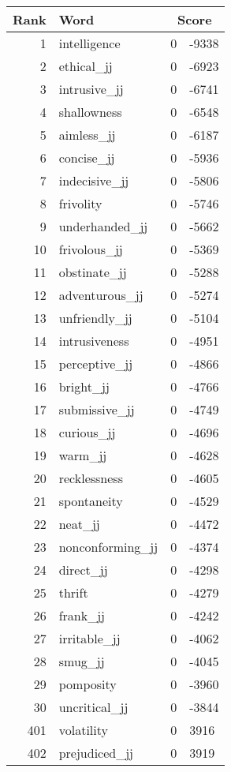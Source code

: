 \begin{longtable}[!htbp]{| rlr@{.}l |}
    \hline
    \textbf{Rank} & \textbf{Word} & \multicolumn{2}{c|}{\textbf{Score}} \\
    \hline
    \endhead
    1 & intelligence & 0 & -9338 \\
    2 & ethical\_jj & 0 & -6923 \\
    3 & intrusive\_jj & 0 & -6741 \\
    4 & shallowness & 0 & -6548 \\
    5 & aimless\_jj & 0 & -6187 \\
    6 & concise\_jj & 0 & -5936 \\
    7 & indecisive\_jj & 0 & -5806 \\
    8 & frivolity & 0 & -5746 \\
    9 & underhanded\_jj & 0 & -5662 \\
    10 & frivolous\_jj & 0 & -5369 \\
    11 & obstinate\_jj & 0 & -5288 \\
    12 & adventurous\_jj & 0 & -5274 \\
    13 & unfriendly\_jj & 0 & -5104 \\
    14 & intrusiveness & 0 & -4951 \\
    15 & perceptive\_jj & 0 & -4866 \\
    16 & bright\_jj & 0 & -4766 \\
    17 & submissive\_jj & 0 & -4749 \\
    18 & curious\_jj & 0 & -4696 \\
    19 & warm\_jj & 0 & -4628 \\
    20 & recklessness & 0 & -4605 \\
    21 & spontaneity & 0 & -4529 \\
    22 & neat\_jj & 0 & -4472 \\
    23 & nonconforming\_jj & 0 & -4374 \\
    24 & direct\_jj & 0 & -4298 \\
    25 & thrift & 0 & -4279 \\
    26 & frank\_jj & 0 & -4242 \\
    27 & irritable\_jj & 0 & -4062 \\
    28 & smug\_jj & 0 & -4045 \\
    29 & pomposity & 0 & -3960 \\
    30 & uncritical\_jj & 0 & -3844 \\
    401 & volatility & 0 & 3916 \\
    402 & prejudiced\_jj & 0 & 3919 \\

\end{longtable}
